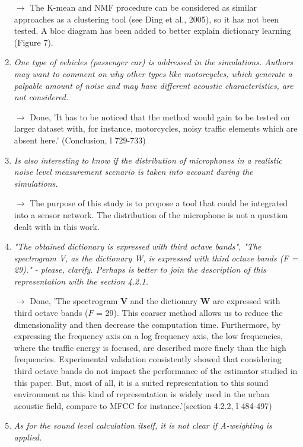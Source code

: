 \documentclass[10pt]{article}
\begin{document}
\begin{enumerate}
$\rightarrow$ The K-mean and NMF procedure can be considered as similar approaches as a clustering tool (see Ding et al., 2005), so it has not been tested.
A bloc diagram has been added to better explain dictionary learning (Figure 7).


\item \emph{One type of vehicles (passenger car) is addressed in the simulations. Authors may want to comment on why other types like motorcycles, which generate a palpable amount of noise and may have different acoustic characteristics, are not considered.}

$\rightarrow$ Done, 'It has to be noticed that the method would gain to be tested on larger dataset with, for instance, motorcycles, noisy traffic elements which are absent here.' (Conclusion, l 729-733)

\item \emph{Is also interesting to know if the distribution of microphones in a realistic noise level measurement scenario is taken into account during the simulations.}

$\rightarrow$ The purpose of this study is to propose a tool that could be integrated into a sensor network. The distribution of the microphone is not a question dealt with in this work.

\item \emph{"The obtained dictionary is expressed with third octave bands", "The spectrogram V, as the dictionary W, is expressed with third octave bands (F = 29)." - please, clarify. Perhaps is better to join the description of this representation with the section 4.2.1.}

$\rightarrow$ Done, 'The spectrogram $\mathbf{V}$ and the dictionary $\mathbf{W}$ are expressed with third octave bands ($F$ = 29). This coarser method allows us to reduce the dimensionality and then decrease the computation time. Furthermore, by expressing the frequency axis on a log frequency axis, the low frequencies, where the traffic energy is focused, are described more finely than the high frequencies. Experimental validation consistently showed that considering third octave bands do not impact the performance of the estimator studied in this paper. But, most of all, it is a suited representation to this sound environment as this kind of representation is widely used in the urban acoustic field, compare to MFCC for instance.'(section 4.2.2, l 484-497)

\item \emph{As for the sound level calculation itself, it is not clear if A-weighting is applied.}


\end{enumerate}
\end{document}
